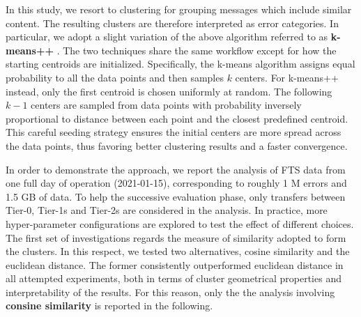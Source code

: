 In this study, we resort to clustering for grouping messages which include similar content.
The resulting clusters are therefore interpreted as error categories.
In particular, we adopt a slight variation of the above algorithm referred to as \textbf{k-means++} \cite{arthur2006kmeans++}.
The two techniques share the same workflow except for how the starting centroids are initialized.  
Specifically, the k-means algorithm assigns equal probability to all the data points and then samples $k$ centers.
For k-means++ instead, only the first centroid is chosen uniformly at random. The following $k-1$ centers are sampled from data points with probability inversely proportional to distance between each point and the closest predefined centroid.
This careful seeding strategy ensures the initial centers are more spread across the data points, thus favoring better clustering results and a faster convergence.

In order to demonstrate the approach, we report the analysis of FTS data from one full day of operation (2021-01-15), corresponding to roughly 1 M errors and 1.5 GB of data.
To help the successive evaluation phase, only transfers between Tier-0, Tier-1s and Tier-2s are considered in the analysis.
In practice, more hyper-parameter configurations are explored to test the effect of different choices.
The first set of investigations regards the measure of similarity adopted to form the clusters. 
In this respect, we tested two alternatives, cosine similarity and the euclidean distance.
The former consistently outperformed euclidean distance in all attempted experiments, 
both in terms of cluster geometrical properties and interpretability of the results.
For this reason, only the the analysis involving \textbf{consine similarity} is reported in the following.

